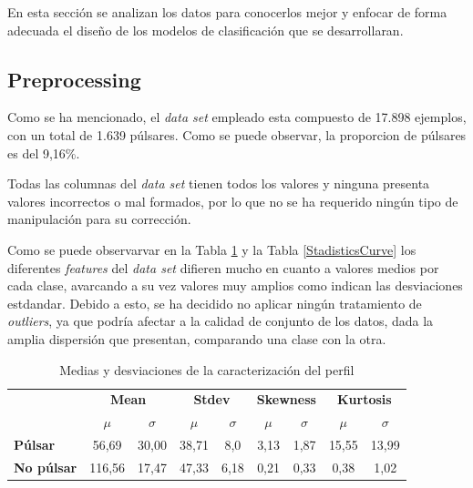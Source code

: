 \documentclass[a4paper]{article} %
\begin{document}
En esta sección se analizan los datos para conocerlos mejor y enfocar de forma adecuada el diseño de los modelos de clasificación que se desarrollaran.

\subsection{Preprocessing}
Como se ha mencionado, el \textit{data set} \cite{HTRU2} empleado esta compuesto de 17.898 ejemplos, con un total de 1.639 púlsares. Como se puede observar, la proporcion de púlsares es del 9,16\%. \vspace{5mm}

Todas las columnas del \textit{data set} tienen todos los valores y ninguna presenta valores incorrectos o mal formados, por lo que no se ha requerido ningún tipo de manipulación para su corrección.\vspace{5mm}

Como se puede observarvar en la Tabla \ref{StadisticsProfile} y la Tabla \ref{StadisticsCurve} los diferentes \textit{features} del \textit{data set} difieren mucho en cuanto a valores medios por cada clase, avarcando a su vez valores muy amplios como indican las desviaciones estdandar. Debido a esto, se ha decidido no aplicar ningún tratamiento de \textit{outliers}, ya que podría afectar a la calidad de conjunto de los datos, dada la amplia dispersión que presentan, comparando una clase con la otra.\vspace{5mm}

\begin{table}[H]
\centering
\begin{tabular}{l|c|c|c|c|c|c|c|c|}
\cline{2-9}
 & \multicolumn{2}{c|}{\textbf{Mean}} & \multicolumn{2}{c|}{\textbf{Stdev}} & \multicolumn{2}{c|}{\textbf{Skewness}} & \multicolumn{2}{c|}{\textbf{Kurtosis}} \\ \cline{2-9} 
 & $\mu$ & $\sigma$ & $\mu$ & $\sigma$ & $\mu$ & $\sigma$ & $\mu$ & $\sigma$ \\ \hline
\multicolumn{1}{|l|}{\textbf{Púlsar}} & 56,69 & 30,00 & 38,71 & 8,0 & 3,13 & 1,87 & 15,55 & 13,99 \\ \hline
\multicolumn{1}{|l|}{\textbf{No púlsar}} & 116,56 & 17,47 & 47,33 & 6,18 & 0,21 & 0,33 & 0,38 & 1,02 \\ \hline
\end{tabular}
\caption{Medias y desviaciones de la caracterización del perfil}
\label{StadisticsProfile}
\end{table}
\end{document}
